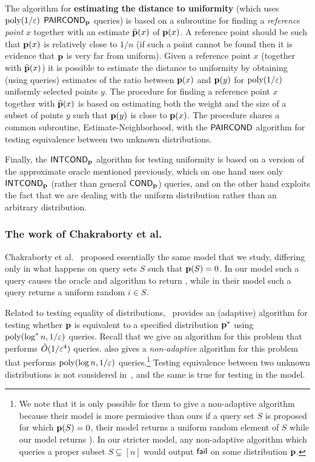 The algorithm for {\bf estimating the distance to uniformity} (which
uses $\operatorname*{poly}(1/\varepsilon)$ ${\sf PAIRCOND}_{\mathbf{p}}$ queries) is based on a subroutine
for finding a {\em reference point\/} $x$ together with an estimate
$\widehat{\mathbf{p}}(x)$ of $\mathbf{p}(x)$. A reference point should be such that
$\mathbf{p}(x)$ is relatively close to $1/n$ (if such a point cannot
be found then it is evidence that $\mathbf{p}$ is very far from uniform). Given a reference point $x$
(together with $\widehat{\mathbf{p}}(x)$) it is possible to estimate the distance to
uniformity by obtaining (using \PCOND queries)
estimates of the ratio between $\mathbf{p}(x)$ and
$\mathbf{p}(y)$ for $\operatorname*{poly}(1/\varepsilon)$ uniformly selected points $y$.
The procedure for finding a reference point $x$ together with $\widehat{\mathbf{p}}(x)$ is based
on estimating both the weight and the size of a subset of points $y$ such that
$\mathbf{p}(y)$ is close to $\mathbf{p}(x)$. The procedure shares
a common subroutine, {\sc Estimate-Neighborhood}, with the ${\sf PAIRCOND}$ algorithm for testing
equivalence between two unknown distributions.

Finally, the ${\sf INTCOND}_{\mathbf{p}}$ algorithm for testing uniformity is based on a version
of the approximate \EVAL oracle mentioned previously,
which on one hand uses only
${\sf INTCOND}_{\mathbf{p}}$ (rather than general ${\sf COND}_{\mathbf{p}}$)
queries, and on the other hand exploits the
fact that we are dealing with the uniform distribution
rather than an arbitrary distribution.


\subsubsection{The work of Chakraborty et al.~\cite{CFGM:13}}
\label{subsec:CFGM}
Chakraborty et al.~\cite{CFGM:13}
proposed essentially the same \COND model that we
study, differing only in what happens on query sets $S$ such that $\mathbf{p}(S)=0$. In
our model such a query causes the \COND oracle and algorithm to return \fail,
while in their model such a query returns a uniform random $i \in S.$

Related to testing equality of distributions,~\cite{CFGM:13} provides
an (adaptive) algorithm for testing whether $\mathbf{p}$ is equivalent to a specified
distribution $\mathbf{p}^*$ using $\operatorname*{poly}(\log^\ast n,1/\varepsilon)$ \COND queries. Recall that
we give an algorithm for this problem that performs $\tilde{O}(1/\varepsilon^4)$
\COND queries.
\cite{CFGM:13} also gives a \emph{non-adaptive}
algorithm for this problem that performs $\operatorname*{poly}(\log n,1/\varepsilon)$ \COND queries.\footnote{We
note that it is only possible for them to give a non-adaptive
algorithm because their model is more
permissive than ours if a query set $S$ is proposed for which $\mathbf{p}(S)=0$,
their model returns a uniform random element of $S$ while our model
returns \fail).  In our stricter model, any non-adaptive algorithm
which queries a proper subset $S \subsetneq[n]$ would output $\textsf{fail}$
on some distribution $\mathbf{p}$.}
Testing equivalence between two unknown distributions is not considered in~\cite{CFGM:13},
and the same is true for testing in the \PCOND model.

